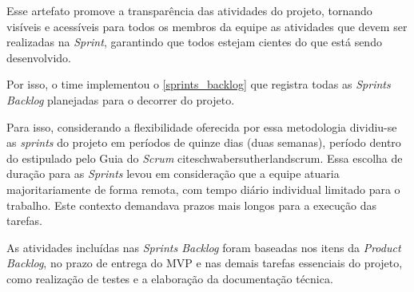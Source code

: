 \documentclass[
	12pt,				%
	openany,			%
	twoside,			%
	a4paper,			%
	english,			%
	french,				%
	spanish,			%
	brazil				%
	]{abntex2}
\begin{document}
Esse artefato promove a transparência das atividades do projeto, tornando visíveis e acessíveis para todos os membros da equipe as atividades que devem ser realizadas na \textit {Sprint}, garantindo que todos estejam cientes do que está sendo desenvolvido.

Por isso, o time implementou o \autoref{sprints_backlog} que registra todas as \textit {Sprints Backlog} planejadas para o decorrer do projeto.

Para isso, considerando a flexibilidade oferecida por essa metodologia dividiu-se as \textit {sprints} do projeto em períodos de quinze dias (duas semanas), período dentro do estipulado pelo Guia do \textit{Scrum} citeschwabersutherlandscrum. Essa escolha de duração para as \textit {Sprints} levou em consideração que a equipe atuaria majoritariamente de forma remota, com tempo diário individual limitado para o trabalho. Este contexto demandava prazos mais longos para a execução das tarefas.

As atividades incluídas nas \textit {Sprints Backlog} foram baseadas nos itens da \textit {Product Backlog}, no prazo de entrega do MVP e nas demais tarefas essenciais do projeto, como realização de testes e a elaboração da documentação técnica.
\end{document}
